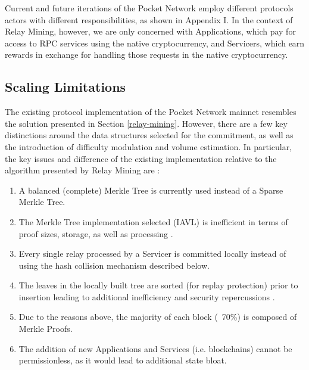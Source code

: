 \documentclass[runningheads]{llncs}
\begin{document}
Current and future iterations of the Pocket Network employ different protocols actors with different responsibilities, as shown in Appendix I. In the context of Relay Mining, however, we are only concerned with Applications, which pay for access to RPC services using the native cryptocurrency, and Servicers, which earn rewards in exchange for handling those requests in the native cryptocurrency.

\subsection{Scaling Limitations}

The existing protocol implementation of the Pocket Network mainnet resembles the solution presented in Section \ref{relay-mining}. However, there are a few key distinctions around the data structures selected for the commitment, as well as the introduction of difficulty modulation and volume estimation. In particular, the key issues and difference of the existing implementation relative to the algorithm presented by Relay Mining are \cite{githubRewardProtocol} \cite{githubProbabilisticProofs}:

\begin{enumerate}
    \item A balanced (complete) Merkle Tree is currently used instead of a Sparse Merkle Tree.
    \item The Merkle Tree implementation selected (IAVL) is inefficient in terms of proof sizes, storage, as well as processing \cite{githubIAVL}.
    \item Every single relay processed by a Servicer is committed locally instead of using the hash collision mechanism described below.
    \item The leaves in the locally built tree are sorted (for replay protection) prior to insertion leading to additional inefficiency and security repercussions \cite{alin2023sortedleaves}.
    \item Due to the reasons above, the majority of each block (~70\%) is composed of Merkle Proofs.    
    \item The addition of new Applications and Services (i.e. blockchains) cannot be permissionless, as it would lead to additional state bloat.
\end{enumerate}
\end{document}
